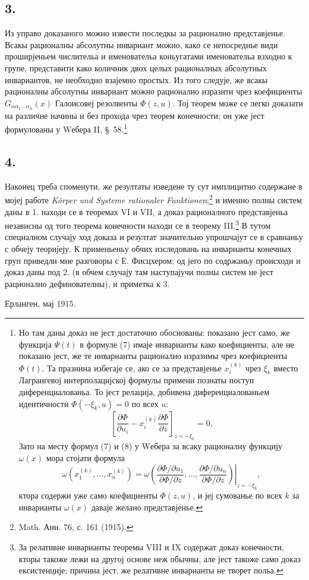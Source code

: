 ﻿\documentclass[11pt]{article}
\begin{document}
\subsection*{3.}
Из управо доказаного можно извести последкы за рационално представјенье. Всакы рационалны абсолутны инвариант можно, како се непосреднье види проширјеньем числительа и именовательа коньугатами именовательа взходно к групе, представити како количник двох целых рационалных абсолутных инвариантов, не необходно взајемно простых. Из того следује, же всакы рационалны абсолутны инвариант можно рационално изразити чрез коефициенты $G_{\alpha\alpha_1\ldots\alpha_n}(x)$ Галоисовеј резолвенты $\Phi(z,u)$. Тој теорем може се легко доказати на различне начины и без прохода чрез теорем конечности; он уже јест формулованы у Wебера II, \S\ 58.\footnote{Но там даны доказ не јест достаточно обоснованы: показано јест само, же функција $\Psi(t)$ в формуле (7) имаје инварианты како коефициенты, але не показано јест, же те инварианты рационално изразимы чрез коефициенты $\Phi(t)$. Та празнина избегаје се, ако се за представјенье $x_i^{(k)}$ чрез $\xi_k$ вместо Лагрангевој интерполацијској формулы примени познаты поступ диференциалованьа. То јест релација, добивена диференциалованьем идентичности $\Phi(-\xi_k,u)=0$ по всех $u$:
\[
 \left[\frac{\partial\Phi}{\partial u_i}
      -x_i^{(k)}\frac{\partial\Phi}{\partial z}\right]_{z=-\xi_k}=0.
\]
Зато на месту формул (7) и (8) у Wебера за всаку рационалну функцију $\omega(x)$ мора стојати формула
\[
 \omega(x_1^{(k)},\ldots,x_n^{(k)})=
 \left.
 \omega\!\left(
   \frac{\partial\Phi/\partial u_1}{\partial\Phi/\partial z},\ldots,
   \frac{\partial\Phi/\partial u_n}{\partial\Phi/\partial z}
 \right)\right|_{z=-\xi_k},
\]
ктора содержи уже само коефициенты $\Phi(z,u)$, и јеј сумованье по всех $k$ за инварианты $\omega(x)$ даваје желано представјенье.}

\subsection*{4.}
Наконец треба споменути, же резултаты изведене ту сут имплицитно содержане в мојеј работе \emph{Körper und Systeme rationaler Funktionen};\footnote{Math. Анн. 76, с. 161 (1915).} и именно полны систем даны в 1. находи се в теоремах VI и VII, а доказ рационалного представјеньа независны од того теорема конечности находи се в теорему III.\footnote{За релативне инварианты теоремы VIII и IX содержат доказ конечности, кторы такоже лежи на другој основе неж обычны, але јест такоже само доказ ексистенције; причина јест, же релативне инварианты не творет польа.} В тутом специалном случају ход доказа и резултат значительно упрошчајут се в сравнаньу с обчеју теоријеју. К применьеньу обчих изследовань на инварианты конечных груп приведли мне разговоры с Е. Фисцхером; од јего по содржаньу происходи и доказ даны под 2. (в обчем случају там наступајучи полны систем не јест рационално дефинователны), и приметка к 3.

Ерланген, мај 1915.
\end{document}
